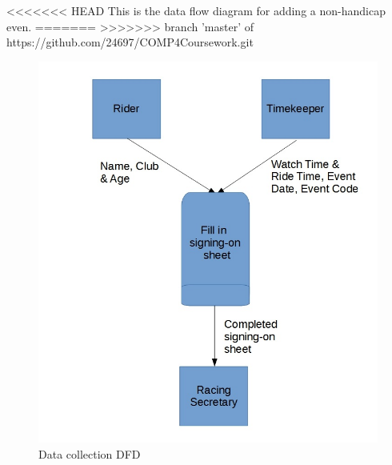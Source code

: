 <<<<<<< HEAD
This is the data flow diagram for adding a non-handicap even.
=======
>>>>>>> branch 'master' of https://github.com/24697/COMP4Coursework.git
\begin{figure}[H]
    \includegraphics[width=\textwidth]{./DFD/Done/JPG/DataCollection.jpg}
    \caption{Data collection DFD} \label{fig:Data collection DFD}
\end{figure}

